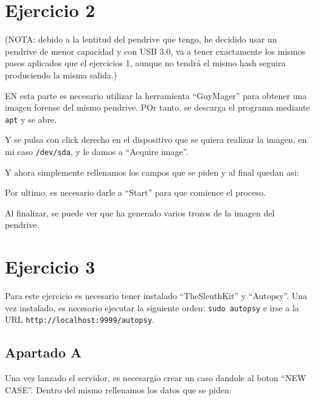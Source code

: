 \documentclass{article}
\begin{document}
\section*{Ejercicio 2}

(NOTA: debido a la lentitud del pendrive que tengo, he decidido usar un pendrive de menor capacidad y con USB 3.0, va a tener exactamente los mismos pasos aplicados que el ejercicios 1, aunque no tendrá el mismo hash seguira produciendo la misma salida.)

EN esta parte es necesario utilizar la herramienta ``GuyMager'' para obtener una imagen forense del mismo pendrive. POr tanto, se descarga el programa mediante \verb|apt| y se abre.


Y se pulsa con click derecho en el dispositivo que se quiera realizar la imagen, en mi caso \verb|/dev/sda|, y le damos a ``Acquire image''.


Y ahora simplemente rellenamos los campos que se piden y al final quedan asi:


Por ultimo, es necesario darle a ``Start'' para que comience el proceso.


Al finalizar, se puede ver que ha generado varios trozos de la imagen del pendrive.


\section*{Ejercicio 3}

Para este ejercicio es necesario tener instalado ``TheSleuthKit'' y ``Autopsy''. Una vez instalado, es necesario ejecutar la siguiente orden: \verb|sudo autopsy| e irse a la URL \verb|http://localhost:9999/autopsy|.


\subsection*{Apartado A}
Una vez lanzado el servidor, es necesargio crear un caso dandole al boton ``NEW CASE''. Dentro del mismo rellenamos los datos que se piden:
\end{document}
